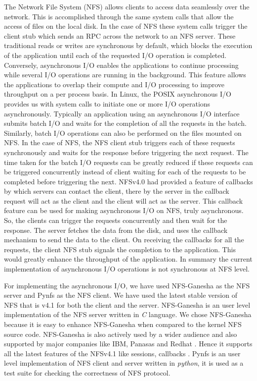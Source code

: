 The Network File System (NFS) allows clients to access data seamlessly over the network. This is accomplished through the same system calls that allow the access of files on the local disk. In the case of NFS these system calls trigger the client stub which sends an RPC across the network to an NFS server. These traditional reads or writes are synchronous by default, which blocks the execution of the application until each of the requested I/O operation is completed. Conversely, asynchronous I/O enables the applications to continue processing while several I/O operations are running in the background. This feature allows the applications to overlap their compute and I/O processing to improve throughput on a per process basis. In Linux, the POSIX asynchronous I/O \cite{aio} provides us with system calls to initiate one or more I/O operations asynchronously. Typically an application using an asynchronous I/O interface submits batch I/O and waits for the completion of all the requests in the batch. Similarly, batch I/O operations can also be performed on the files mounted on NFS. In the case of NFS, the NFS client stub triggers each of these requests synchronously and waits for the response before triggering the next request. The time taken for the batch I/O requests can be greatly reduced if these requests can be triggered concurrently instead of client waiting for each of the requests to be completed before triggering the next. NFSv4.0 had provided a feature of callbacks by which servers can contact the client, there by the server in the callback request will act as the client and the client will act as the server. This callback feature can be used for making  asynchronous I/O on NFS, truly asynchronous. So, the clients can trigger the requests concurrently and then wait for the response. The server fetches the data from the disk, and uses the callback mechanism to send the data to the client. On receiving the callbacks for all the requests, the client NFS stub signals the completion to the  application. This would greatly enhance the throughput of the application. In summary the current implementation of asynchronous I/O operations is not synchronous at NFS level.

For implementing the asynchronous I/O, we have used NFS-Ganesha \cite{ganesha} as the NFS server and Pynfs \cite{pynfs} as the NFS client. We have used the latest stable version of NFS that is v4.1 for both the client and the server. NFS-Ganesha is an user level implementation of the NFS server written in \textit{C} language. We chose NFS-Ganesha because it is easy to enhance NFS-Ganesha when compared to the kernel NFS source code. NFS-Ganesha is also actively used by a wider audience and also supported by major companies like IBM, Panasas and Redhat \cite{NFSGanesha}. Hence it supports all the latest features of the NFSv4.1 like sessions, callbacks \cite{NFSv41rfc}. Pynfs is an user level implementation of NFS client and server written in \textit{python}, it is used as a test suite for checking the correctness of NFS protocol.

